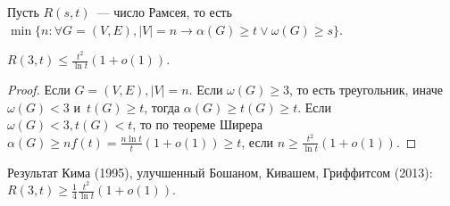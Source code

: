 \documentclass{article}
\begin{document}
Пусть $R(s, t)$~--- число Рамсея, то есть $\min\{n: \forall G = (V, E), |V| = n
\rightarrow \alpha(G) \ge t \vee \omega(G) \ge s\}$.

\begin{claim}
	$R(3, t) \le \frac{t^2}{\ln t} (1 + o(1))$.
\end{claim}
\begin{proof}
	Если $G = (V, E), |V| = n$. Если $\omega(G) \ge 3$, то есть треугольник, иначе
	$\omega(G) < 3$ и~$t(G) \ge t$, тогда $\alpha(G) \ge t(G) \ge t$. Если
	$\omega(G) < 3, t(G) < t$, то по теореме Ширера $\alpha(G) \ge nf(t) = \frac{n
	\ln t}{t} (1 + o(1)) \ge t$, если $n \ge \frac{t^2}{\ln t} (1 + o(1))$.
\end{proof}

Результат Кима (1995), улучшенный Бошаном, Кивашем, Гриффитсом (2013):
$R(3, t) \ge \frac{1}{4} \frac{t^2}{\ln t} (1 + o(1))$.
\end{document}
